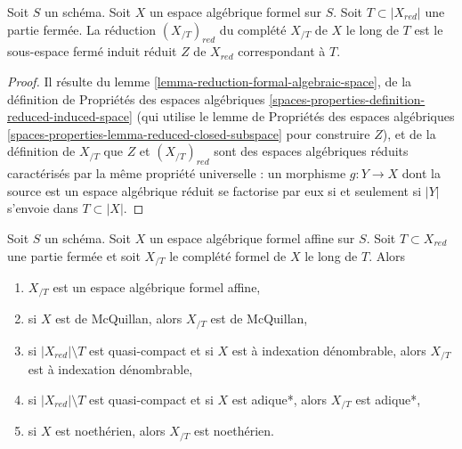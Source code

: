 \begin{lemma}
\label{lemma-reduction-recompletion}
Soit $S$ un schéma. Soit $X$ un espace algébrique formel sur $S$.
Soit $T \subset |X_{red}|$ une partie fermée. La réduction
$(X_{/T})_{red}$ du complété $X_{/T}$ de $X$ le long de $T$ est
le sous-espace fermé induit réduit $Z$ de $X_{red}$ correspondant à $T$.
\end{lemma}

\begin{proof}
Il résulte du lemme \ref{lemma-reduction-formal-algebraic-space},
de la définition de Propriétés des espaces algébriques
\ref{spaces-properties-definition-reduced-induced-space}
(qui utilise le lemme de Propriétés des espaces algébriques
\ref{spaces-properties-lemma-reduced-closed-subspace} pour construire $Z$),
et de la définition de $X_{/T}$ que
$Z$ et $(X_{/T})_{red}$ sont des espaces algébriques réduits
caractérisés par la même propriété universelle :
un morphisme $g : Y \to X$ dont la source est un espace algébrique réduit
se factorise par eux si et seulement si $|Y|$ s'envoie dans $T \subset |X|$.
\end{proof}

\begin{lemma}
\label{lemma-recompletion-affine-types}
Soit $S$ un schéma. Soit $X$ un espace algébrique formel affine sur $S$.
Soit $T \subset X_{red}$ une partie fermée et soit $X_{/T}$
le complété formel de $X$ le long de $T$. Alors
\begin{enumerate}
\item $X_{/T}$ est un espace algébrique formel affine,
\item si $X$ est de McQuillan, alors $X_{/T}$ est de McQuillan,
\item si $|X_{red}| \setminus T$ est quasi-compact et si $X$
est à indexation dénombrable, alors $X_{/T}$ est à indexation dénombrable,
\item si $|X_{red}| \setminus T$ est quasi-compact et si $X$
est adique*, alors $X_{/T}$ est adique*,
\item si $X$ est noethérien, alors $X_{/T}$ est noethérien.
\end{enumerate}
\end{lemma}

